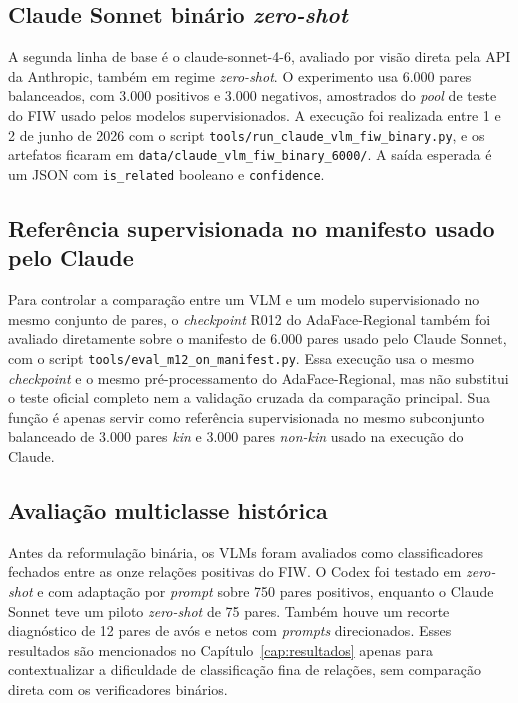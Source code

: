 \subsection{Claude Sonnet binário \textit{zero-shot}}

A segunda linha de base é o claude-sonnet-4-6, avaliado por visão direta pela API da Anthropic, também em regime \textit{zero-shot}. O experimento usa 6.000 pares balanceados, com 3.000 positivos e 3.000 negativos, amostrados do \textit{pool} de teste do FIW usado pelos modelos supervisionados. A execução foi realizada entre 1 e 2 de junho de 2026 com o script \texttt{tools/run\_claude\_vlm\_fiw\_binary.py}, e os artefatos ficaram em \texttt{data/claude\_vlm\_fiw\_binary\_6000/}. A saída esperada é um JSON com \texttt{is\_related} booleano e \texttt{confidence}.

\subsection{Referência supervisionada no manifesto usado pelo Claude}

Para controlar a comparação entre um VLM e um modelo supervisionado no mesmo conjunto de pares, o \textit{checkpoint} R012 do AdaFace-Regional também foi avaliado diretamente sobre o manifesto de 6.000 pares usado pelo Claude Sonnet, com o script \texttt{tools/eval\_m12\_on\_manifest.py}. Essa execução usa o mesmo \textit{checkpoint} e o mesmo pré-processamento do AdaFace-Regional, mas não substitui o teste oficial completo nem a validação cruzada da comparação principal. Sua função é apenas servir como referência supervisionada no mesmo subconjunto balanceado de 3.000 pares \textit{kin} e 3.000 pares \textit{non-kin} usado na execução do Claude.

\subsection{Avaliação multiclasse histórica}

Antes da reformulação binária, os VLMs foram avaliados como classificadores fechados entre as onze relações positivas do FIW. O Codex foi testado em \textit{zero-shot} e com adaptação por \textit{prompt} sobre 750 pares positivos, enquanto o Claude Sonnet teve um piloto \textit{zero-shot} de 75 pares. Também houve um recorte diagnóstico de 12 pares de avós e netos com \textit{prompts} direcionados. Esses resultados são mencionados no Capítulo~\ref{cap:resultados} apenas para contextualizar a dificuldade de classificação fina de relações, sem comparação direta com os verificadores binários.

